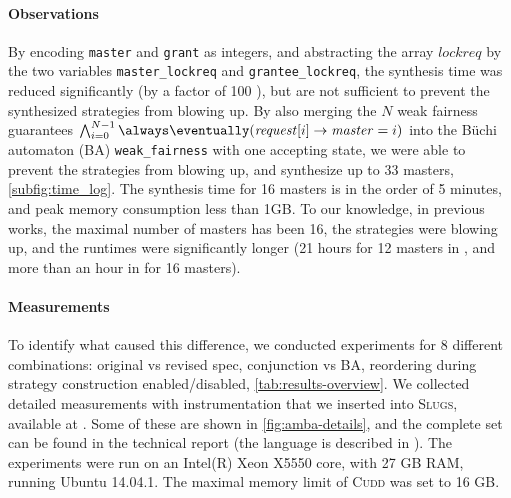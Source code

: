 \documentclass[copyright]{eptcs}
\begin{document}
\paragraph{Observations}

By encoding \texttt{master} and \texttt{grant} as integers, and abstracting the array $\mathit{lockreq}$ by the two variables \texttt{master\_lockreq} and \texttt{grantee\_lockreq}, the synthesis time was reduced significantly (by a factor of 100 \cite{Filippidis15cds4-amba}), but are not sufficient to prevent the synthesized strategies from blowing up.
By also merging the $N$ weak fairness guarantees
$\bigwedge_{i = 0}^{N - 1} \always \eventually ( \mathit{request}[i] \rightarrow \mathit{master} = i)$
into the B\"{u}chi automaton (BA) \texttt{weak\_fairness} with one accepting state, we were able to prevent the strategies from blowing up, and synthesize up to 33 masters, \cref{subfig:time_log}.
The synthesis time for 16 masters is in the order of 5 minutes, and peak memory consumption less than 1GB.
To our knowledge, in previous works, the maximal number of masters has been 16, the strategies were blowing up, and the runtimes were significantly longer (21 hours for 12 masters in \cite{Bloem12jcss}, and more than an hour in \cite{Godhal13sttt} for 16 masters).


\paragraph{Measurements}
\label{sec:measurements}

To identify what caused this difference, we conducted experiments for 8 different combinations: original vs revised spec, conjunction vs BA, reordering during strategy construction enabled/disabled, \cref{tab:results-overview}.
We collected detailed measurements with instrumentation that we inserted into \textsc{Slugs}, available at \cite{slugsfork}.
Some of these are shown in \cref{fig:amba-details}, and the complete set can be found in the technical report \cite{Filippidis15cds4-amba} (the language is described in \cite{Filippidis15cds3-synt}).
The experiments were run on an Intel(R) Xeon\textsuperscript{\textregistered} X5550 core, with 27 GB RAM, running Ubuntu 14.04.1.
The maximal memory limit of \textsc{Cudd} \cite{Somenzi12cudd} was set to 16 GB.
\end{document}
